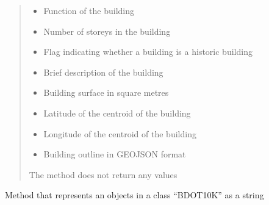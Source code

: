 \documentclass[letterpaper,10pt,english]{sphinxmanual}
\begin{document}
\begin{fulllineitems}
\begin{fulllineitems}
\begin{quote}
\begin{description}
\begin{itemize}
\item {} 
\sphinxAtStartPar
{} \textendash{} Function of the building

\item {} 
\sphinxAtStartPar
{} \textendash{} Number of storeys in the building

\item {} 
\sphinxAtStartPar
{} \textendash{} Flag indicating whether a building is a historic building

\item {} 
\sphinxAtStartPar
{} \textendash{} Brief description of the building

\item {} 
\sphinxAtStartPar
{} \textendash{} Building surface in square metres

\item {} 
\sphinxAtStartPar
{} \textendash{} Latitude of the centroid of the building

\item {} 
\sphinxAtStartPar
{} \textendash{} Longitude of the centroid of the building

\item {} 
\sphinxAtStartPar
{} \textendash{} Building outline in GEOJSON format

\end{itemize}

\sphinxAtStartPar
The method does not return any values

\end{description}\end{quote}

\end{fulllineitems}


\begin{fulllineitems}
\label{\detokenize{db_classes:db_classes.BDOT10K.__repr__}}
\pysigstartsignatures
{}
\pysigstopsignatures
\sphinxAtStartPar
Method that represents an objects in a class “BDOT10K” as a string
\begin{quote}\begin{description}
\sphinxAtStartPar
{}


\end{description}
\end{quote}
\end{fulllineitems}
\end{fulllineitems}
\end{document}
